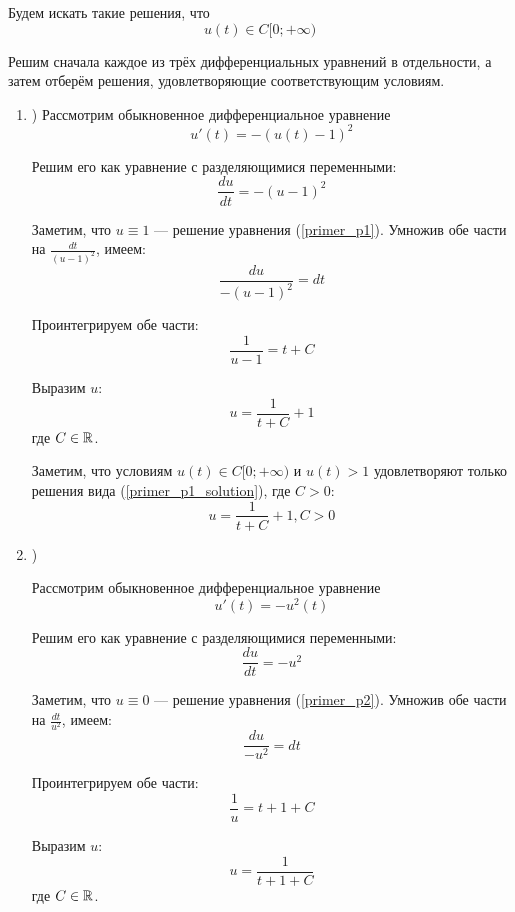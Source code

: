 Будем искать такие решения, что
\begin{equation}
	u(t) \in C[0; +\infty)
\end{equation}

Решим сначала каждое из трёх дифференциальных уравнений в отдельности, а затем отберём решения,
удовлетворяющие соответствующим условиям.

\begin{enumerate}

\item)
Рассмотрим обыкновенное дифференциальное уравнение
\begin{equation}\label{primer_p1}
	u'(t)=-(u(t)-1)^2
\end{equation}

Решим его как уравнение с разделяющимися переменными:
$$
	\frac{du}{dt}=-(u-1)^2
$$

Заметим, что $u\equiv 1$ --- решение уравнения (\ref{primer_p1}).
Умножив обе части на $\frac{dt}{(u-1)^2}$, имеем:
$$
	\frac{du}{-(u-1)^2}=dt
$$

Проинтегрируем обе части:
$$
	\frac{1}{u-1}=t+C
$$

Выразим $u$:
\begin{equation}\label{primer_p1_solution}
	u=\frac{1}{t+C}+1
\end{equation}
где $C\in\mathbb{R}$.

Заметим, что условиям $u(t) \in C[0; +\infty)$ и $u(t)>1$ удовлетворяют только решения вида (\ref{primer_p1_solution}), где $C>0$:
\begin{equation}
	u=\frac{1}{t+C}+1, C>0
\end{equation}


\item)

Рассмотрим обыкновенное дифференциальное уравнение
\begin{equation}\label{primer_p2}
	u'(t)=-u^2(t)
\end{equation}

Решим его как уравнение с разделяющимися переменными:
$$
	\frac{du}{dt}=-u^2
$$

Заметим, что $u\equiv 0$ --- решение уравнения (\ref{primer_p2}).
Умножив обе части на $\frac{dt}{u^2}$, имеем:
$$
	\frac{du}{-u^2}=dt
$$

Проинтегрируем обе части:
$$
	\frac{1}{u}=t+1+C
$$

Выразим $u$:
\begin{equation}\label{primer_p2_solution}
	u=\frac{1}{t+1+C}
\end{equation}
где $C\in\mathbb{R}$.


\end{enumerate}
